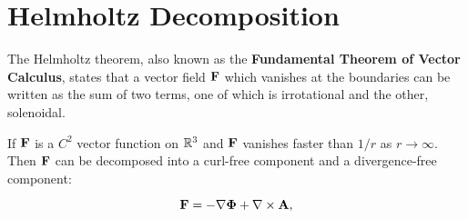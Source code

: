  \section{Helmholtz Decomposition}



The Helmholtz theorem, also known
as the \textbf{Fundamental Theorem of Vector Calculus},  states that  a vector field
$\mathbf{ F}$ which vanishes at the boundaries can be written as the
sum of two terms, one of which is irrotational and the other,
solenoidal.





\begin{thm} 
If $\mathbf{ F}$ is a $C^2$ vector function  on  $\mathbb{R}^3$
 and $\mathbf{ F}$ vanishes faster than $1/r$ as $r \to \infty$.
Then $\mathbf{ F}$ can be decomposed into a curl-free component and a divergence-free component:

\[\mathbf{ F}=-\nabla\boldsymbol{\Phi}+\nabla\times\mathbf{ A},\]
\end{thm}

